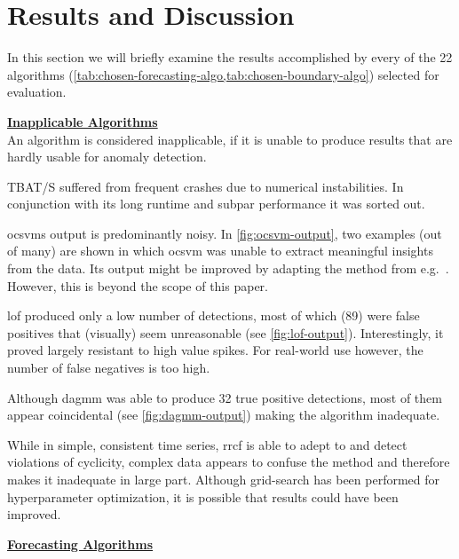 \section{Results and Discussion}\label{sect:results-and-discussion}
In this section we will briefly examine the results accomplished by every
of the 22 algorithms (\cref{tab:chosen-forecasting-algo,tab:chosen-boundary-algo})
selected for evaluation.

\bigskip
{\large\uline{\textbf{Inapplicable Algorithms}}}\\
An algorithm is considered inapplicable, if it is unable to produce results that
are hardly usable for anomaly detection.
\begin{description}[style=unboxed,leftmargin=0cm]
    \item[TBAT/S] TBAT/S suffered from frequent crashes due to numerical instabilities.
    In conjunction with its long runtime and subpar performance it was sorted out.
    \item[OCSVM] \gls{ocsvm}s output is predominantly noisy. In \cref{fig:ocsvm-output},
    two examples (out of many) are shown in which \gls{ocsvm} was unable to extract
    meaningful insights from the data. Its output might be improved by adapting
    the method from e.g.\ \textcite{GomezVerdejo.2011}. However, this is beyond
    the scope of this paper.
    \item[LOF] \gls{lof} produced only a low number of detections, most of which
    (89) were false positives that (visually) seem unreasonable (see \cref{fig:lof-output}).
    Interestingly, it proved largely resistant to high value spikes.
    For real-world use however, the number of false negatives is too high.
    \item[DAGMM] Although \gls{dagmm} was able to produce 32 true positive detections,
    most of them appear coincidental (see \cref{fig:dagmm-output}) making the 
    algorithm inadequate.
    \item[RRCF] While in simple, consistent time series, \gls{rrcf} is able to
    adept to and detect violations of cyclicity, complex data appears to confuse
    the method and therefore makes it inadequate in large part. Although grid-search
    has been performed for hyperparameter optimization, it is possible that
    results could have been improved.
\end{description}
\bigskip
{\large\uline{\textbf{Forecasting Algorithms}}}\\
